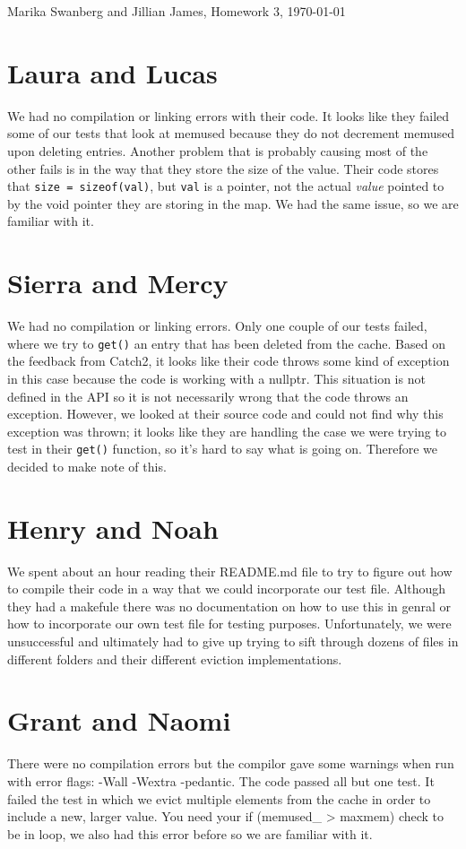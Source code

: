\documentclass[12pt]{article}
\author{Marika Swanberg}
\begin{document}
Marika Swanberg and Jillian James, Homework 3, \today
\bigskip 

\section{Laura and Lucas}
We had no compilation or linking errors with their code. It looks like they failed some of our tests that look at memused because they do not decrement memused upon deleting entries. Another problem that is probably causing most of the other fails is in the way that they store the size of the value. Their code stores that \texttt{size = sizeof(val)}, but \texttt{val} is a pointer, not the actual \textit{value} pointed to by the void pointer they are storing in the map. We had the same issue, so we are familiar with it.

\section{Sierra and Mercy}
We had no compilation or linking errors. Only one couple of our tests failed, where we try to \texttt{get()} an entry that has been deleted from the cache. Based on the feedback from Catch2, it looks like their code throws some kind of exception in this case because the code is working with a nullptr. This situation is not defined in the API so it is not necessarily wrong that the code throws an exception. However, we looked at their source code and could not find why this exception was thrown; it looks like they are handling the case we were trying to test in their \texttt{get()} function, so it's hard to say what is going on. Therefore we decided to make note of this.

\section{Henry and Noah}
We spent about an hour reading their README.md file to try to figure out how to compile their code in a way that we could incorporate our test file. Although they had a makefule there was no documentation on how to use this in genral or how to incorporate our own test file for testing purposes. Unfortunately, we were unsuccessful and ultimately had to give up trying to sift through dozens of files in different folders and their different eviction implementations.

\section{Grant and Naomi}
There were no compilation errors but the compilor gave some warnings when run with error flags: -Wall -Wextra -pedantic. The code passed all but one test. It failed the test in which we evict multiple elements from the cache in order to include a new, larger value. You need your if (memused_ > maxmem) check to be in loop, we also had this error before so we are familiar with it. 
\end{document}
